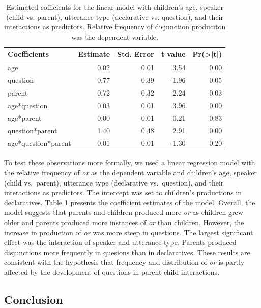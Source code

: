 \documentclass[,man,floatsintext]{apa6}
\begin{document}
\begin{table}[t]

\caption{\label{tab:study1coeftable}Estimated cofficients for the linear model with children's age, speaker (child vs. parent), utterance type (declarative vs. question), and their interactions as predictors. Relative frequency of disjunction produciton was the dependent variable.}
\centering
\fontsize{9}{11}\selectfont
\begin{tabular}{l|r|r|r|r}
\hline
Coefficients & Estimate & Std. Error & t value & Pr(>|t|)\\
\hline
age & 0.02 & 0.01 & 3.54 & 0.00\\
\hline
question & -0.77 & 0.39 & -1.96 & 0.05\\
\hline
parent & 0.72 & 0.32 & 2.24 & 0.03\\
\hline
age*question & 0.03 & 0.01 & 3.96 & 0.00\\
\hline
age*parent & 0.00 & 0.01 & 0.21 & 0.83\\
\hline
question*parent & 1.40 & 0.48 & 2.91 & 0.00\\
\hline
age*question*parent & -0.01 & 0.01 & -1.30 & 0.20\\
\hline
\end{tabular}
\end{table}

To test these observations more formally, we used a linear regression model with the relative frequency of \emph{or} as the dependent variable and children's age, speaker (child vs.~parent), utterance type (declarative vs.~question), and their interactions as predictors. The intercept was set to children's productions in declaratives. Table \ref{tab:study1coeftable} presents the coefficient estimates of the model. Overall, the model suggests that parents and children produced more \emph{or} as children grew older and parents produced more instances of \emph{or} than children. However, the increase in production of \emph{or} was more steep in questions. The largest significant effect was the interaction of speaker and utterance type. Parents produced disjunctions more frequently in quesions than in declaratives. These results are consistent with the hypothesis that frequency and distribution of \emph{or} is partly affected by the development of questions in parent-child interactions.

\hypertarget{study1discussion}{%
\subsection{Conclusion}\label{study1discussion}}
\end{document}
